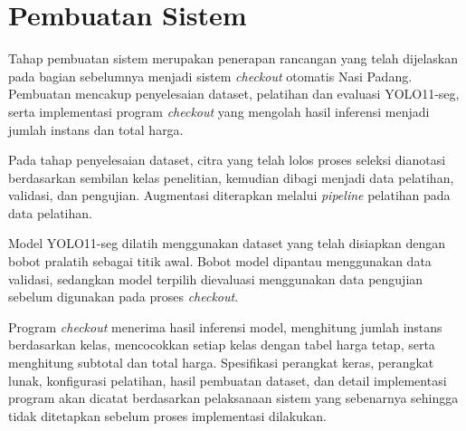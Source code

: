 \section{Pembuatan Sistem}

Tahap pembuatan sistem merupakan penerapan rancangan yang telah dijelaskan pada bagian sebelumnya menjadi sistem \textit{checkout} otomatis Nasi Padang. Pembuatan mencakup penyelesaian dataset, pelatihan dan evaluasi YOLO11-seg, serta implementasi program \textit{checkout} yang mengolah hasil inferensi menjadi jumlah instans dan total harga.

Pada tahap penyelesaian dataset, citra yang telah lolos proses seleksi dianotasi berdasarkan sembilan kelas penelitian, kemudian dibagi menjadi data pelatihan, validasi, dan pengujian. Augmentasi diterapkan melalui \textit{pipeline} pelatihan pada data pelatihan.

Model YOLO11-seg dilatih menggunakan dataset yang telah disiapkan dengan bobot pralatih sebagai titik awal. Bobot model dipantau menggunakan data validasi, sedangkan model terpilih dievaluasi menggunakan data pengujian sebelum digunakan pada proses \textit{checkout}.

Program \textit{checkout} menerima hasil inferensi model, menghitung jumlah instans berdasarkan kelas, mencocokkan setiap kelas dengan tabel harga tetap, serta menghitung subtotal dan total harga. Spesifikasi perangkat keras, perangkat lunak, konfigurasi pelatihan, hasil pembuatan dataset, dan detail implementasi program akan dicatat berdasarkan pelaksanaan sistem yang sebenarnya sehingga tidak ditetapkan sebelum proses implementasi dilakukan.

